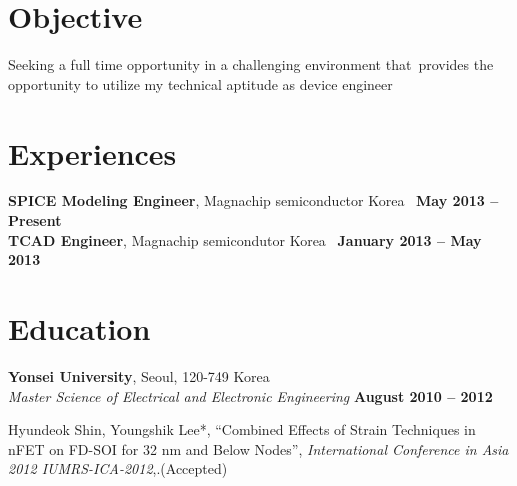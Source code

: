 \documentclass[margin,line]{mycv1}
\begin{document}
\begin{resume}

\section{\mysidestyle Objective}
Seeking a full time opportunity in a challenging environment that\
provides the opportunity to utilize my technical aptitude as device engineer 
\section{\mysidestyle Experiences}

\textbf{SPICE Modeling Engineer}, Magnachip semiconductor Korea \
    \hfill \textbf{May 2013 -- Present}\vspace{3mm}\\\vspace{-1mm}%
    \textbf{TCAD Engineer}, Magnachip semicondutor Korea \
    \hfill \textbf{January 2013 -- May 2013}\vspace{3mm}\\\vspace{-1mm}%

\section{\mysidestyle Education}

\textbf{Yonsei University}, Seoul, 120-749 Korea 
\vspace{2mm}\\
\textsl{Master Science of Electrical and Electronic Engineering}
\hfill \textbf{August 2010 -- 2012}
\vspace{-1mm}
    
Hyundeok Shin, Youngshik Lee*,
``Combined Effects of Strain Techniques in nFET on FD-SOI for 32 nm and Below Nodes'',
\textsl{ International Conference in Asia 2012 IUMRS-ICA-2012},.(Accepted)


\end{resume}
\end{document}
